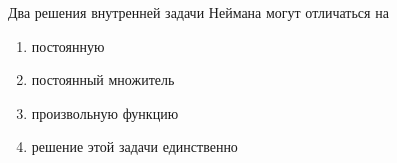 Два решения внутренней задачи Неймана могут отличаться на

\begin{enumerate}[label=\arabic*)]
    \item постоянную
    \item постоянный множитель
    \item произвольную функцию
    \item решение этой задачи единственно
\end{enumerate}

